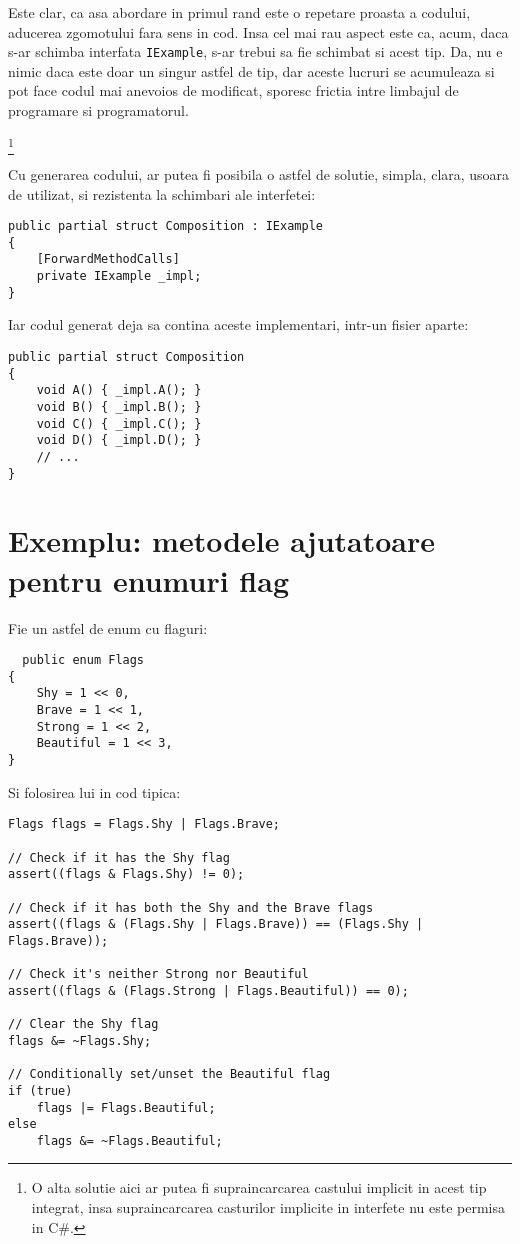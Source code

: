 \documentclass{report}
\begin{document}
Este clar, ca asa abordare in primul rand este o repetare proasta a
codului, aducerea zgomotului fara sens in cod. Insa cel mai rau aspect
este ca, acum, daca s-ar schimba interfata \texttt{IExample}, s-ar
trebui sa fie schimbat si acest tip. Da, nu e nimic daca este doar un
singur astfel de tip, dar aceste lucruri se acumuleaza si pot face codul
mai anevoios de modificat, sporesc frictia intre limbajul de programare
si programatorul.

\footnote{
  O alta solutie aici ar putea fi supraincarcarea castului implicit in
  acest tip integrat, insa supraincarcarea casturilor implicite in
  interfete nu este permisa in C\#.
}

Cu generarea codului, ar putea fi posibila o astfel de solutie, simpla,
clara, usoara de utilizat, si rezistenta la schimbari ale interfetei:

\begin{lstlisting}
public partial struct Composition : IExample
{
    [ForwardMethodCalls]
    private IExample _impl;
}
\end{lstlisting}

Iar codul generat deja sa contina aceste implementari, intr-un fisier
aparte:

\begin{lstlisting}
public partial struct Composition
{
    void A() { _impl.A(); }
    void B() { _impl.B(); }
    void C() { _impl.C(); }
    void D() { _impl.D(); }
    // ...
}
\end{lstlisting}


\section{Exemplu: metodele ajutatoare pentru enumuri flag}

Fie un astfel de enum cu flaguri:

\begin{lstlisting}
  public enum Flags
{
    Shy = 1 << 0,
    Brave = 1 << 1,
    Strong = 1 << 2,
    Beautiful = 1 << 3,
}
\end{lstlisting}

Si folosirea lui in cod tipica:

\begin{lstlisting}
Flags flags = Flags.Shy | Flags.Brave;

// Check if it has the Shy flag
assert((flags & Flags.Shy) != 0);

// Check if it has both the Shy and the Brave flags
assert((flags & (Flags.Shy | Flags.Brave)) == (Flags.Shy | Flags.Brave));

// Check it's neither Strong nor Beautiful
assert((flags & (Flags.Strong | Flags.Beautiful)) == 0);

// Clear the Shy flag
flags &= ~Flags.Shy;

// Conditionally set/unset the Beautiful flag
if (true)
    flags |= Flags.Beautiful;
else
    flags &= ~Flags.Beautiful;
\end{lstlisting}
\end{document}
